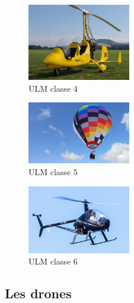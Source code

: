 	\begin{figure}[H]
  	\centering
    \includegraphics[width=0.4\textwidth]{1-EtudeAeronefs/img/ULM_Classe_4.jpg}
  	\caption{ULM classe 4 \cite{img:ulmClasse4}}
	\end{figure}	
	
	\begin{figure}[H]
  	\centering
    \includegraphics[width=0.4\textwidth]{1-EtudeAeronefs/img/ULM_Classe_5.jpg}
  	\caption{ULM classe 5 \cite{img:ulmClasse5}}
	\end{figure}	
	
	\begin{figure}[H]
  	\centering
    \includegraphics[width=0.4\textwidth]{1-EtudeAeronefs/img/ULM_Classe_6.jpg}
  	\caption{ULM classe 6 \cite{img:ulmClasse6}}
	\end{figure}


\subsection{Les drones}